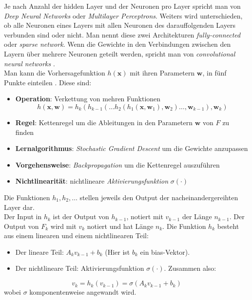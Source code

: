 Je nach Anzahl der hidden Layer und der Neuronen pro Layer spricht man von \textit{Deep Neural Networks} oder \textit{Multilayer Perceptrons}. Weiters wird unterschieden, ob
alle Neuronen eines Layers mit allen Neuronen des darauffolgenden Layers verbunden sind oder nicht. Man nennt diese zwei Architekturen \textit{fully-connected} oder \textit{sparse network}.
Wenn die Gewichte in den Verbindungen zwischen den Layern \"uber mehrere Neuronen geteilt werden, spricht man von \textit{convolutional neural networks} \cite[Kapitel 7.2]{strang}. \\

Man kann die Vorhersagefunktion $h(\mathbf{x})$ mit ihren Parametern $\mathbf{w}$, in f\"unf Punkte einteilen \cite[Kapitel 7.1]{strang}.
Diese sind:
\begin{itemize}
	\item \textbf{Operation}: Verkettung von mehren Funktionen
	      $$h(\mathbf{x}, \mathbf{w}) = h_k(h_{k-1}(\dots h_2(h_1(\mathbf{x}, \mathbf{w}_1), \mathbf{w}_2)\dots,\mathbf{w}_{k-1}),\mathbf{w}_k)$$
	\item \textbf{Regel}: Kettenregel um die Ableitungen in den Parametern $\mathbf{w}$ von $F$ zu finden
	\item \textbf{Lernalgorithmus}: \textit{Stochastic Gradient Descent} um die Gewichte anzupassen
	\item \textbf{Vorgehensweise}: \textit{Backpropagation} um die Kettenregel auszuf\"uhren
	\item \textbf{Nichtlinearit\"at}: nichtlineare \textit{Aktivierungsfunktion} $\sigma(\cdot)$
\end{itemize}

Die Funktionen $h_1, h_2, \dots$ stellen jeweils den Output der nacheinandergereihten Layer dar. \\

Der Input in $h_k$ ist der Output von $h_{k-1}$, notiert mit $v_{k-1}$ der L\"ange $n_{k-1}$. Der Output von $F_k$ wird mit $v_k$ notiert und hat L\"ange $n_k$.
Die Funktion $h_k$ besteht aus einem linearen und einem nichtlinearen Teil:

\begin{itemize}
	\item Der lineare Teil: $A_k v_{k-1} + b_k$ (Hier ist $b_k$ ein bias-Vektor).
	\item Der nichtlineare Teil: Aktivierungsfunktion $\sigma(\cdot)$. Zusammen also:
\end{itemize}
$$ v_k = h_k(v_{k-1}) = \sigma(A_k v_{k-1} + b_k) $$
wobei $\sigma$ komponentenweise angewandt wird.\\

